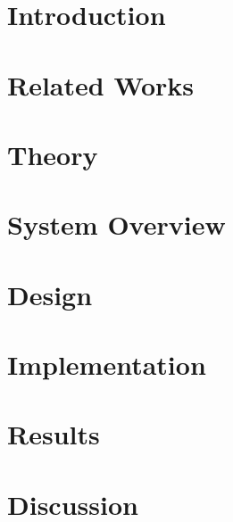\documentclass[a4paper, 12pt, openany]{book} %
\begin{document}

\chapter{Introduction}

\cleardoublepage


\chapter{Related Works}
\label{chap:related_works}

\cleardoublepage

\chapter{Theory}
\label{chap:theory}

\cleardoublepage

\chapter{System Overview}
\label{chap:system_overview}

\cleardoublepage

\chapter{Design}
\label{chap:design}

\cleardoublepage

\chapter{Implementation}
\label{chap:implementation}

\cleardoublepage

\chapter{Results}
\label{chap:results}

\cleardoublepage

\chapter{Discussion}
\label{chap:discussion}

\cleardoublepage
\end{document}
